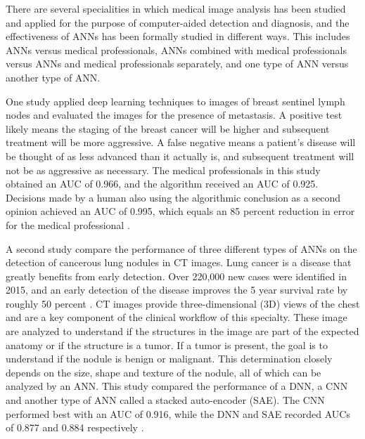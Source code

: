 \documentclass[sigconf]{acmart}
\begin{document}
There are several specialities in which medical image analysis has been studied and applied for the purpose of computer-aided detection and diagnosis, and the effectiveness of ANNs has been formally studied in different ways. This includes ANNs versus medical professionals, ANNs combined with medical professionals versus ANNs and medical professionals separately, and one type of ANN versus another type of ANN.

One study applied deep learning techniques to images of breast sentinel lymph nodes and evaluated the images for the presence of metastasis. A positive test likely means the staging of the breast cancer will be higher and subsequent treatment will be more aggressive. A false negative means a patient's disease will be thought of as less advanced than it actually is, and subsequent treatment will not be as aggressive as necessary. The medical professionals in this study obtained an AUC of 0.966, and the algorithm received an AUC of 0.925. Decisions made by a human also using the algorithmic conclusion as a second opinion achieved an AUC of 0.995, which equals an 85 percent reduction in error for the medical professional \cite{cite09}.

A second study compare the performance of three different types of ANNs on the detection of cancerous lung nodules in CT images. Lung cancer is a disease that greatly benefits from early detection. Over 220,000 new cases were identified in 2015, and an early detection of the disease improves the 5 year survival rate by roughly 50 percent \cite{cite10}. CT images provide three-dimensional (3D) views of the chest and are a key component of the clinical workflow of this specialty. These image are analyzed to understand if the structures in the image are part of the expected anatomy or if the structure is a tumor. If a tumor is present, the goal is to understand if the nodule is benign or malignant. This determination closely depends on the size, shape and texture of the nodule, all of which can be analyzed by an ANN. This study compared the performance of a DNN, a CNN and another type of ANN called a stacked auto-encoder (SAE). The CNN performed best with an AUC of 0.916, while the DNN and SAE recorded AUCs of 0.877 and 0.884 respectively \cite{cite10}.
\end{document}
